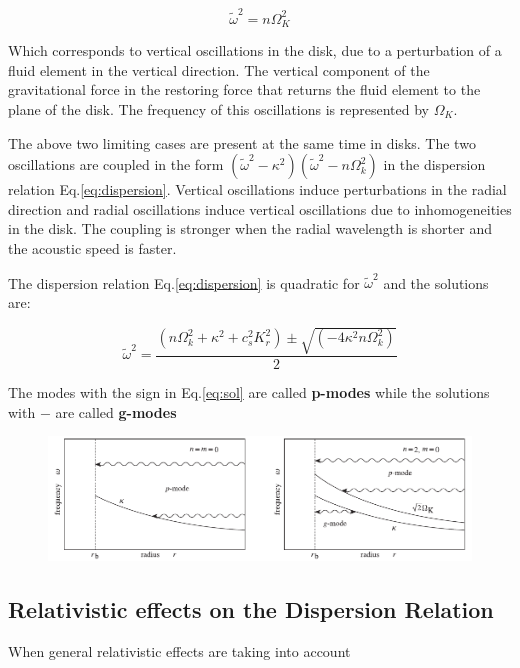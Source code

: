 \begin{equation}
\tilde{\omega}^2 = n \Omega_K^2
\end{equation}

Which corresponds to vertical oscillations in the disk, due to a
perturbation of a fluid element in the vertical direction. The
vertical component of the gravitational force in the restoring force
that returns the fluid element to the plane of the disk. The frequency
of this oscillations is represented by $\Omega_K$.


The above two limiting cases are present at the same time in disks.
The two oscillations are coupled in the form $(\tilde{\omega}^2 -
\kappa^2)(\tilde{\omega}^2 - n\Omega_k^2)$ in the dispersion relation
Eq.\ref{eq:dispersion}. Vertical oscillations induce perturbations
in the radial direction and radial oscillations induce vertical
oscillations due to inhomogeneities in the disk. The
coupling is stronger when the radial wavelength is shorter and the
acoustic speed is faster.

The dispersion relation Eq.\ref{eq:dispersion} is quadratic for
$\tilde{\omega}^2$ and the solutions are:

\begin{equation}\label{eq:sol}
\tilde{\omega}^2 = \dfrac{(n\Omega_k^2 + \kappa^2 + c_s^2 K_r^2) \pm
\sqrt{( - 4\kappa^2n\Omega_k^2)}}{2}
\end{equation}

The modes with the  sign in Eq.\ref{eq:sol} are called
\textbf{p-modes} while the solutions with $-$ are called
\textbf{g-modes}

\begin{figure}
\centering
\includegraphics[scale=0.5]{waves.png}
\end{figure}



\subsection{Relativistic effects on the Dispersion Relation}

When general relativistic effects are taking into account 


